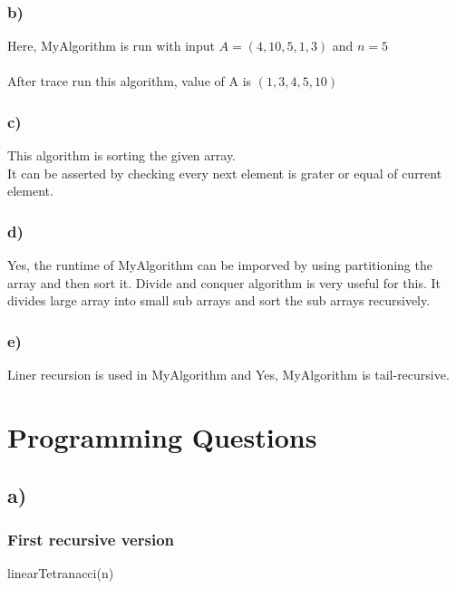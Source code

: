 \documentclass[10pt, a4paper]{article}
\begin{document}
	\subsubsection*{b)}
	{Here, MyAlgorithm is run with input $ A = (4,10,5,1,3) $ and $ n = 5$ \\ \\}
	{After trace run this algorithm, value of A is $ (1,3,4,5,10) $ }
	\subsubsection*{c)}
	{This algorithm is sorting the given array.}\\
	{It can be asserted by checking every next element is grater or equal of current element.}
	
	
	\subsubsection*{d)}
	{Yes, the runtime of MyAlgorithm can be imporved by using partitioning the array and then sort it. Divide and conquer algorithm is very useful for this. It divides large array into small sub arrays and sort the sub arrays recursively.}
	\subsubsection*{e)}
	{Liner recursion is used in MyAlgorithm and Yes, MyAlgorithm is tail-recursive.}

	\newpage
	\section*{Programming Questions}
	\subsection*{a)}
	\subsubsection*{First recursive version}
	{\SetAlgoNoLine%
    \begin{algorithm}
        
            \DontPrintSemicolon %
            
            
        \EndFunction
        \caption{linearTetranacci(n)}
    \end{algorithm}}%
    
\end{document}
